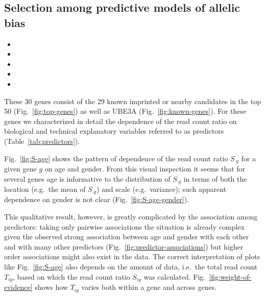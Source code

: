 \documentclass[12pt,letterpaper]{article}
\begin{document}
\subsection{Selection among predictive models of allelic bias}
\label{sec:results-regression}

\begin{itemize}
\item {}
\item {}
\item {}
\item {}
\item {}
\end{itemize}

These 30 genes consist of the 29 known imprinted or
nearby candidates in the top 50 (Fig.~\ref{fig:top-genes}) as well as UBE3A
(Fig.~\ref{fig:known-genes}).  For these genes we characterized in detail the
dependence of the read count ratio on biological and technical explanatory
variables referred to as predictors (Table~\ref{tab:predictors}).

Fig.~\ref{fig:S-age} shows the pattern of dependence of
the read count ratio \(S_{\cdot g}\) for a given gene \(g\) on age and gender.  From
this visual inspection it seems that for several genes age is informative to
the distribution of \(S_{\cdot g}\) in terms of both the location (e.g.~the mean of
\(S_{\cdot g}\)) and scale (e.g.~variance); such apparent dependence on gender is not
clear (Fig.~\ref{fig:S-age-gender}).

This qualitative result, however, is greatly complicated by the association
among predictors: taking only pairwise associations the situation is already
complex given the observed strong association between age and gender with each
other and with many other predictors (Fig.~\ref{fig:predictor-associations})
but higher order associations might also exist in the data.
The correct interpretation of plots like Fig.~\ref{fig:S-age} also depends on
the amount of data, i.e.~the total read count \(T_{ig}\), based on which the
read count ratio \(S_{ig}\) was calculated.  Fig.~\ref{fig:weight-of-evidence}
shows how \(T_{ig}\) varies both within a gene and across genes.
\end{document}
